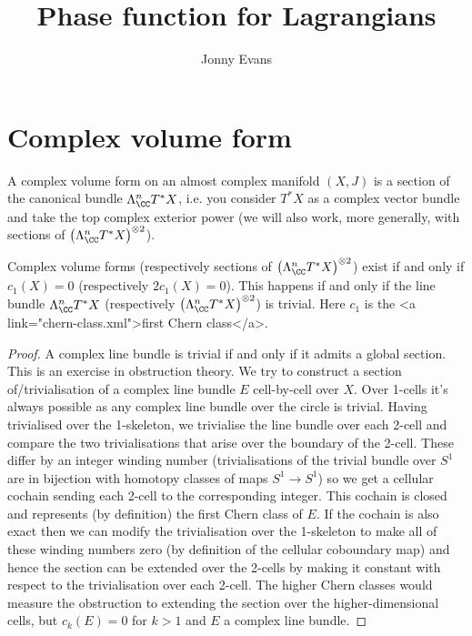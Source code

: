 \documentclass{article}
\title{Phase function for Lagrangians}
\author{Jonny Evans}
\begin{document}
\section{Complex volume form}
  
\begin{Definition}
  A complex volume form on an almost complex manifold $(X,J)$ is a section of the canonical bundle $\Lambda^n_{\CC}T^*X$, i.e. you consider $T^*X$ as a complex vector bundle and take the top complex exterior power (we will also work, more generally, with sections of $\left(\Lambda^n_{\CC}T^*X\right)^{\otimes 2}$).
\end{Definition}


\begin{Lemma}
  Complex volume forms (respectively sections of $\left(\Lambda^n_{\CC}T^*X\right)^{\otimes 2}$) exist if and only if $c_1(X)=0$ (respectively $2c_1(X)=0$). This happens if and only if the line bundle $\Lambda^n_{\CC}T^*X$ (respectively $\left(\Lambda^n_{\CC}T^*X\right)^{\otimes 2}$) is trivial. Here $c_1$ is the <a link="chern-class.xml">first Chern class</a>.
\end{Lemma}
\begin{proof}
  A complex line bundle is trivial if and only if it admits a global section. This is an exercise in obstruction theory. We try to construct a section of/trivialisation of a complex line bundle $E$ cell-by-cell over $X$. Over 1-cells it's always possible as any complex line bundle over the circle is trivial. Having trivialised over the 1-skeleton, we trivialise the line bundle over each 2-cell and compare the two trivialisations that arise over the boundary of the 2-cell. These differ by an integer winding number (trivialisations of the trivial bundle over $S^1$ are in bijection with homotopy classes of maps $S^1\to S^1$) so we get a cellular cochain sending each 2-cell to the corresponding integer. This cochain is closed and represents (by definition) the first Chern class of $E$. If the cochain is also exact then we can modify the trivialisation over the 1-skeleton to make all of these winding numbers zero (by definition of the cellular coboundary map) and hence the section can be extended over the 2-cells by making it constant with respect to the trivialisation over each 2-cell. The higher Chern classes would measure the obstruction to extending the section over the higher-dimensional cells, but $c_k(E)=0$ for $k>1$ and $E$ a complex line bundle.
\end{proof}
\end{document}
